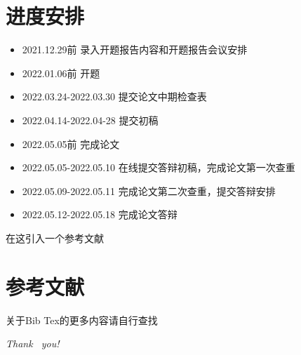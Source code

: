 \documentclass{beamer}
\begin{document}
\section{进度安排}

\begin{frame}
	\begin{itemize}
		\item 2021.12.29前 录入开题报告内容和开题报告会议安排
		\item 2022.01.06前 开题
		\item 2022.03.24-2022.03.30 提交论文中期检查表
		\item 2022.04.14-2022.04-28 提交初稿
		\item 2022.05.05前 完成论文
		\item 2022.05.05-2022.05.10 在线提交答辩初稿，完成论文第一次查重
		\item 2022.05.09-2022.05.11 完成论文第二次查重，提交答辩安排
		\item 2022.05.12-2022.05.18 完成论文答辩
	\end{itemize}
	在这引入一个参考文献 \cite{name1}
\end{frame}

\section{参考文献}

\begin{frame}[allowframebreaks]

	
	

	关于Bib Tex的更多内容请自行查找
\end{frame}

\begin{frame}
	\begin{center}
		{\Huge \emph {\textrm{Thank  ~you!}}}
	\end{center}
\end{frame}
\end{document}
